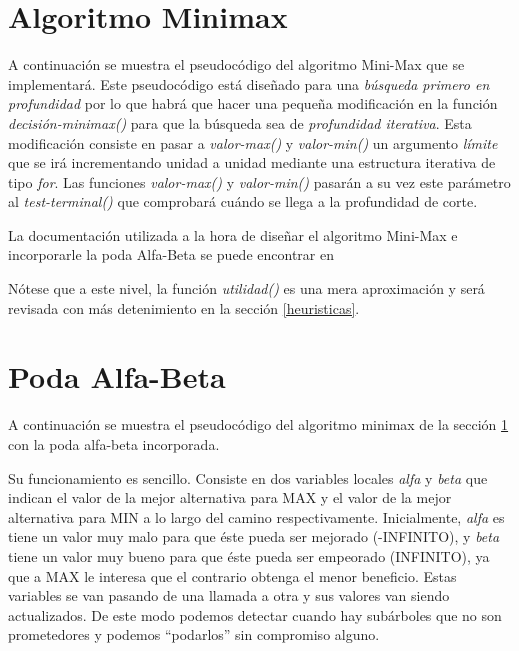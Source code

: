 \section {Algoritmo Minimax}
\label{minimax}
A continuación se muestra el pseudocódigo del algoritmo Mini-Max que
se implementará. Este pseudocódigo está diseñado para una
\emph{búsqueda primero en profundidad} por lo que habrá que hacer una
pequeña modificación en la función \emph{decisión-minimax()} para que
la búsqueda sea de \emph{profundidad iterativa}. Esta modificación
consiste en pasar a \emph{valor-max()} y \emph{valor-min()} un
argumento \emph{límite} que se irá incrementando unidad a unidad
mediante una estructura iterativa de tipo \emph{for}. Las funciones
\emph{valor-max()} y \emph{valor-min()} pasarán a su vez este
parámetro al \emph{test-terminal()} que comprobará cuándo se llega a
la profundidad de corte.

La documentación utilizada a la hora de diseñar el algoritmo Mini-Max
e incorporarle la poda Alfa-Beta se puede encontrar en
\cite{russell03}

Nótese que a este nivel, la función \emph{utilidad()} es una mera
aproximación y será revisada con más detenimiento en la sección
\ref{heuristicas}.

\texttt{}

\section {Poda Alfa-Beta}
A continuación se muestra el pseudocódigo del algoritmo minimax de la
sección \ref{minimax} con la poda alfa-beta incorporada.

Su funcionamiento es sencillo. Consiste en dos variables locales
\emph{alfa} y \emph{beta} que indican el valor de la mejor alternativa
para MAX y el valor de la mejor alternativa para MIN a lo largo del
camino respectivamente. Inicialmente, \emph{alfa} es tiene un valor
muy malo para que éste pueda ser mejorado (-INFINITO), y \emph{beta}
tiene un valor muy bueno para que éste pueda ser empeorado (INFINITO),
ya que a MAX le interesa que el contrario obtenga el menor
beneficio. Estas variables se van pasando de una llamada a otra y sus
valores van siendo actualizados. De este modo podemos detectar cuando
hay subárboles que no son prometedores y podemos ``podarlos'' sin
compromiso alguno.

\texttt{}

